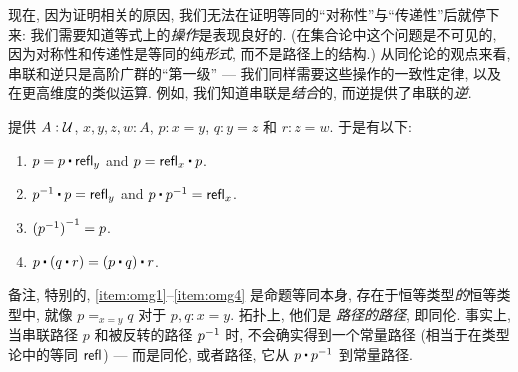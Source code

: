 现在, 因为证明相关的原因, 我们无法在证明等同的``对称性''与``传递性''后就停下来: 我们需要知道等式上的\emph{操作}是表现良好的.
(在集合论中这个问题是不可见的, 因为对称性和传递性是等同的纯\emph{形式}, 而不是路径上的结构.)
从同伦论的观点来看, 串联和逆只是高阶广群的``第一级'' --- 我们同样需要这些操作的一致性定律, 以及在更高维度的类似运算.
例如, 我们知道串联是\emph{结合}的, 而逆提供了串联的\emph{逆}.

\begin{lem}
    \label{thm:omg}%
    提供 $A:\mathcal{U}$, $x,y,z,w:A$, $p:x= y$, $q:y = z$ 和 $r:z=w$.
    于是有以下:
    \begin{enumerate}
        \item $p= p\ct \refl{y}$ and $p = \refl{x} \ct p$.\label{item:omg1}
        \item $\opp{p}\ct p= \refl{y}$ and $p\ct \opp{p}= \refl{x}$.\label{item:omg2}
        \item $\mathord{{(\mathord{{p}^{-1}})}^{-1}}= p$.\label{item:omg3}
        \item $p\ct (q\ct r)= (p\ct q)\ct r$.\label{item:omg4}
    \end{enumerate}
\end{lem}

备注, 特别的, \ref{item:omg1}--\ref{item:omg4} 是命题等同本身, 存在于恒等类型\emph{的}恒等类型中, 就像 $p=_{x=y}q$ 对于 $p,q:x=y$.
拓扑上, 他们是 \emph{路径的路径}, 即同伦.
事实上, 当串联路径 $p$ 和被反转的路径 $\mathord{{p}^{-1}}$ 时, 不会确实得到一个常量路径 (相当于在类型论中的等同 $\mathsf{refl}_{}$) --- 而是同伦, 或者路径, 它从 $p\ct\opp p$ 到常量路径.

